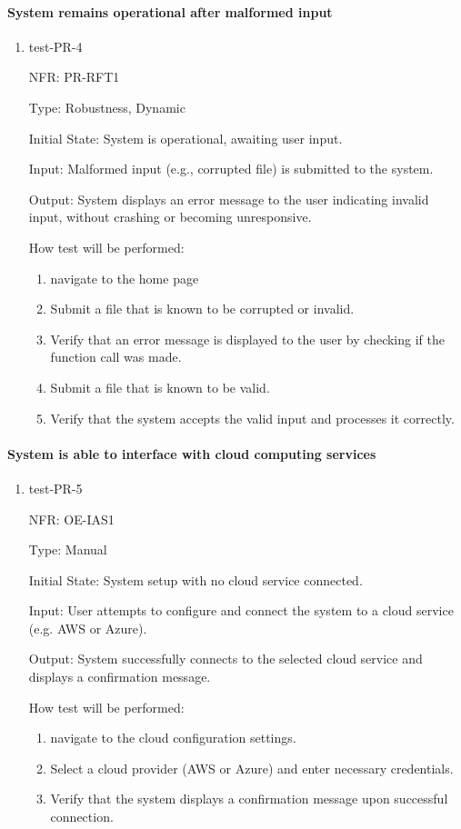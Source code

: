 \documentclass[12pt, titlepage]{article}
\begin{document}
\paragraph{System remains operational after malformed input}
\begin{enumerate}
  \item{test-PR-4}

  NFR: PR-RFT1

  Type: Robustness, Dynamic
            
  Initial State: System is operational, awaiting user input.
            
  Input:  Malformed input (e.g., corrupted file) is submitted to the system.
            
  Output: System displays an error message to the user indicating invalid input, without crashing or becoming unresponsive.
            
  How test will be performed: 
  \begin{enumerate}
    \item navigate to the home page
    \item Submit a file that is known to be corrupted or invalid.
    \item Verify that an error message is displayed to the user by checking if the function call was made.
    \item Submit a file that is known to be valid.
    \item Verify that the system accepts the valid input and processes it correctly.
  \end{enumerate}
\end{enumerate}

\paragraph{System is able to interface with cloud computing services}
\begin{enumerate}
  \item{test-PR-5}

  NFR: OE-IAS1

  Type: Manual
            
  Initial State: System setup with no cloud service connected.
            
  Input:  User attempts to configure and connect the system to a cloud service (e.g. AWS or Azure).
            
  Output: System successfully connects to the selected cloud service and displays a confirmation message.
            
  How test will be performed: 
  \begin{enumerate}
    \item navigate to the cloud configuration settings.
    \item Select a cloud provider (AWS or Azure) and enter necessary credentials.
    \item Verify that the system displays a confirmation message upon successful connection.
  \end{enumerate}
\end{enumerate}
\end{document}
